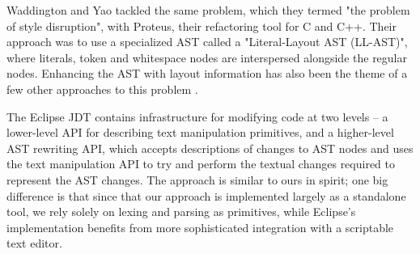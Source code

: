 Waddington and Yao \cite{Proteus} tackled the same problem, which they termed
"the problem of style disruption", with Proteus, their refactoring tool for C
and C++. Their approach was to use a specialized AST called a "Literal-Layout
AST (LL-AST)", where literals, token and whitespace nodes are interspersed
alongside the regular nodes. Enhancing the AST with layout information has also
been the theme of a few other approaches to this problem \cite{RefactorErl}.


The Eclipse JDT contains infrastructure for modifying code at two levels -- a
lower-level API for describing text manipulation primitives, and a higher-level
AST rewriting API, which accepts descriptions of changes to AST nodes and uses
the text manipulation API to try and perform the textual changes required to
represent the AST changes. The approach is similar to ours in spirit; one big
difference is that since that our approach is implemented largely as a
standalone tool, we rely solely on lexing and parsing as primitives, while
Eclipse's implementation benefits from more sophisticated integration with a
scriptable text editor.
